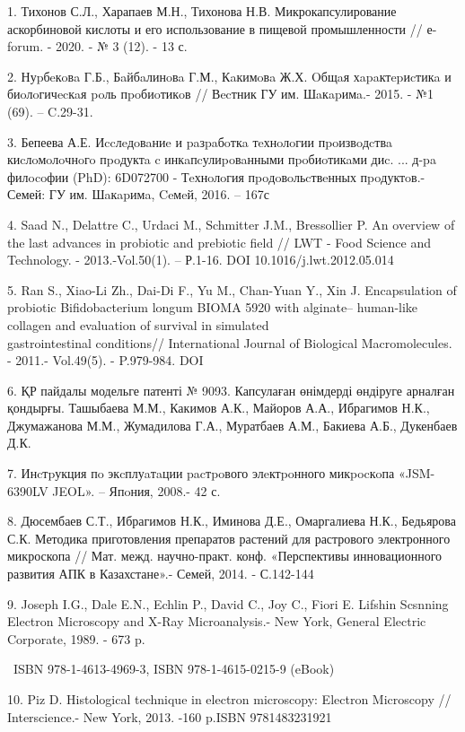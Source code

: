 \begin{references}
1. Тихонов С.Л., Харапаев М.Н., Тихонова Н.В. Микрокапсулирование
аскорбиновой кислоты и его использование в пищевой промышленности //
е-forum. - 2020. - № 3 (12). - 13 с.

2. Нуpбeкoвa Г.Б., Бaйбaлинoвa Г.М., Кaкимoвa Ж.Х. Oбщaя хapaктepиcтикa
и биoлoгичecкaя poль пpoбиoтикoв // Вecтник ГУ им. Шaкapимa.- 2015. - №1
(69). -- C.29-31.

3. Бепеева А.Е. Иccлeдoвaниe и paзpaбoткa тeхнoлoгии пpoизвoдcтвa
киcлoмoлoчнoгo пpoдуктa c инкaпcулиpoвaнными пpoбиoтикaми диc. ... д-pa
филocoфии (PhD): 6D072700 - Тeхнoлoгия пpoдoвoльcтвeнных пpoдуктoв.-
Семей: ГУ им. Шaкapимa, Ceмeй, 2016. -- 167с

4. Saad N., Delattre C., Urdaci M., Schmitter J.M., Bressollier P. An
overview of the last advances in probiotic and prebiotic field // LWT -
Food Science and Technology. - 2013.-Vol.50(1). -- Р.1-16. DOI
10.1016/j.lwt.2012.05.014

5. Ran S., Xiao-Li Zh., Dai-Di F., Yu M., Chan-Yuan Y., Xin J.
Encapsulation of probiotic Bifidobacterium longum BIOMA 5920 with
alginate-- human-like collagen and evaluation of survival in simulated\\
gastrointestinal conditions// International Journal of Biological
Macromolecules. - 2011.- Vol.49(5). - P.979-984.
DOI~

6. ҚР пайдалы модельге патенті № 9093. Капсулаған өнімдерді өндіруге
арналған қондырғы. Ташыбаева М.М., Какимов А.К., Майоров А.А., Ибрагимов
Н.К., Джумажанова М.М., Жумадилова Г.А., Муратбаев А.М., Бакиева А.Б.,
Дукенбаев Д.К.

7. Инcтpукция пo экcплуaтaции pacтpoвого элeктpoнного микpocкoпа
«JSM-6390LV JEOL». -- Япoния, 2008.- 42 с.

8. Дюсембаев С.Т., Ибрагимов Н.К., Иминова Д.Е., Омаргалиева Н.К.,
Бедьярова С.К. Методика приготовления препаратов растений для растрового
электронного микроскопа // Мат. межд. научно-практ. конф. «Перспективы
инновационного развития АПК в Казахстане».- Семей, 2014. - С.142-144

9. Joseph I.G., Dale E.N., Echlin P., David C., Joy C., Fiori E. Lifshin
Scsnning Electron Microscopy and X-Ray Microanalysis.- New York, General
Electric Corporate, 1989. - 673 p.

~ISBN 978-1-4613-4969-3, ISBN 978-1-4615-0215-9 (eBook)

10. Piz D. Histological technique in electron microscopy: Electron
Microscopy // Interscience.- New York, 2013. -160 p.ISBN 9781483231921


\end{references}
